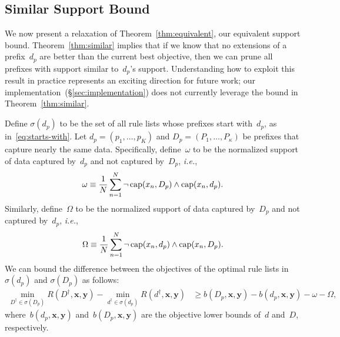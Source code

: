 \documentclass[twoside,11pt]{article}
\def\ie{{\it i.e.},~}
\newcommand{\x}{\mathbf{x}}
\newcommand{\y}{\mathbf{y}}
\def\RL{{d}}
\def\Prefix{d_p}
\def\RLB{{D}}
\def\PrefixB{D_p}
\def\Obj{R}
\def\Reg{{\lambda}}
\def\Cap{\textnormal{cap}}
\def\StartsWith{\sigma}
\begin{document}
\begin{arxiv}
\subsection{Similar Support Bound}
\label{sec:similar}

We now present a relaxation of Theorem~\ref{thm:equivalent},
our equivalent support bound.
%
Theorem~\ref{thm:similar} implies that if we know that no extensions of
a prefix~$\Prefix$ are better than the current best objective,
then we can prune all prefixes with support similar to~$\Prefix$'s support.
%
Understanding how to exploit this result in practice
represents an exciting direction for future work;
our implementation~(\S\ref{sec:implementation}) does not
currently leverage the bound in Theorem~\ref{thm:similar}.

\begin{theorem}
\label{thm:similar}
Define $\StartsWith(\Prefix)$ to be the set of all rule lists
whose prefixes start with~$\Prefix$, as in~\eqref{eq:starts-with}.
%
Let ${\Prefix = (p_1, \dots, p_K)}$ and
${\PrefixB = (P_1, \dots, P_{\kappa})}$ be prefixes
that capture nearly the same data.
%
Specifically, define~$\omega$ to be the normalized support
of data captured by~$\Prefix$ and not captured by~$\PrefixB$, \ie
\begin{align}
\omega \equiv \frac{1}{N} \sum_{n=1}^N
  \neg\, \Cap(x_n, \PrefixB)
  \wedge \Cap(x_n, \Prefix). %
\label{eq:omega}
\end{align}
%
Similarly, define~$\Omega$ to be the normalized support
of data captured by~$\PrefixB$ and not captured by~$\Prefix$, \ie
\begin{align}
\Omega \equiv \frac{1}{N} \sum_{n=1}^N
  \neg\, \Cap(x_n, \Prefix)
  \wedge \Cap(x_n, \PrefixB). %
\label{eq:big-omega}
\end{align}
We can bound the difference between the objectives of the
optimal rule lists in~$\StartsWith(\Prefix)$
and $\StartsWith(\PrefixB)$ as follows:
\begin{align}
\min_{\RLB^\dagger \in \StartsWith(\PrefixB)} \Obj(\RLB^\dagger, \x, \y)
- \min_{\RL^\dagger \in \StartsWith(\Prefix)} \Obj(\RL^\dagger, \x, \y)
&\ge b(\PrefixB, \x, \y) - b(\Prefix, \x, \y) - \omega - \Omega,
\label{eq:similar}
\end{align}
where~$b(\Prefix, \x, \y)$ and~$b(\PrefixB, \x, \y)$ are the
objective lower bounds of~$\RL$ and~$\RLB$, respectively.
\end{theorem}


\end{arxiv}
\end{document}
